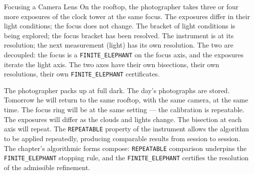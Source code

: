\begin{coda}{Focusing a Camera Lens}
On the rooftop, the photographer takes three or four more
exposures of the clock tower at the same focus. The exposures
differ in their light conditions; the focus does not change.
The bracket of light conditions is being explored; the focus
bracket has been resolved. The instrument is at its
resolution; the next measurement (light) has its own
resolution. The two are decoupled: the focus is a
\texttt{FINITE\_ELEPHANT} on the focus axis, and the
exposures iterate the light axis. The two axes have their
own bisections, their own resolutions, their own
\texttt{FINITE\_ELEPHANT} certificates.

The photographer packs up at full dark. The day's photographs
are stored. Tomorrow he will return to the same rooftop, with
the same camera, at the same time. The focus ring will be at
the same setting --- the calibration is repeatable. The
exposures will differ as the clouds and lights change. The
bisection at each axis will repeat. The
\texttt{REPEATABLE} property of the instrument allows the
algorithm to be applied repeatedly, producing comparable
results from session to session. The chapter's
algorithmic forms compose: \texttt{REPEATABLE} comparison
underpins the \texttt{FINITE\_ELEPHANT} stopping rule, and
the \texttt{FINITE\_ELEPHANT} certifies the resolution of
the admissible refinement.

\end{coda}

